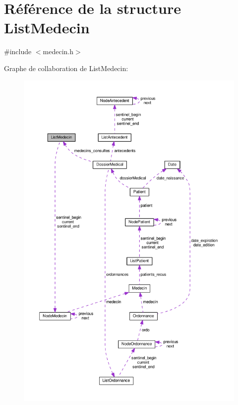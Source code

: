 \hypertarget{struct_list_medecin}{\section{Référence de la structure List\-Medecin}
\label{struct_list_medecin}
}


{\ttfamily \#include $<$medecin.\-h$>$}



Graphe de collaboration de List\-Medecin\-:
\nopagebreak
\begin{figure}[H]
\begin{center}
\leavevmode
\includegraphics[width=350pt]{struct_list_medecin__coll__graph}
\end{center}
\end{figure}

